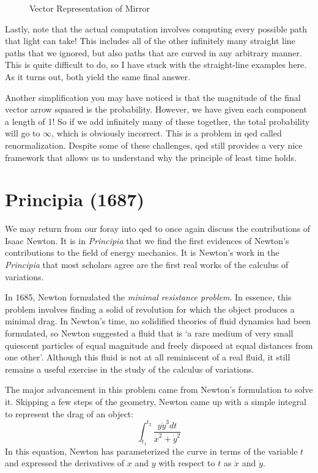 \begin{figure}
    \centering

    \caption{Vector Representation of Mirror}
    \label{fig:mirror vec 2}
\end{figure}

Lastly, note that the actual computation involves computing every possible path that light can take! This includes all of the other infinitely many straight line paths that we ignored, but also paths that are curved in any arbitrary manner. This is quite difficult to do, so I have stuck with the straight-line examples here. As it turns out, both yield the same final answer.

Another simplification you may have noticed is that the magnitude of the final vector arrow squared is the probability. However, we have given each component a length of 1! So if we add infinitely many of these together, the total probability will go to $\infty$, which is obviously incorrect. This is a problem in \gls{qed} called renormalization. Despite some of these challenges, \gls{qed} still provides a very nice framework that allows us to understand why the principle of least time holds.

\section{Principia (1687)}
We may return from our foray into \gls{qed} to once again discuss the contributions of Isaac Newton. It is in \textit{Principia} that we find the first evidences of Newton's contributions to the field of energy mechanics. It is Newton's work in the \textit{Principia} that most scholars agree are the first real works of the calculus of variations.

In 1685, Newton formulated the \textit{minimal resistance problem}. In essence, this problem involves finding a solid of revolution for which the object produces a minimal drag. In Newton's time, no solidified theories of fluid dynamics had been formulated, so Newton suggested a fluid that is `a rare medium of very small quiescent particles of equal magnitude and freely disposed at equal distances from one other'. Although this fluid is not at all reminiscent of a real fluid, it still remains a useful exercise in the study of the calculus of variations.

The major advancement in this problem came from Newton's formulation to solve it. Skipping a few steps of the geometry, Newton came up with a simple integral to represent the drag of an object:
$$\int_{t_1}^{t_2}{\frac{y\dot{y}^3dt}{\dot{x}^2+\dot{y}^2}}$$
In this equation, Newton has parameterized the curve in terms of the variable $t$ and expressed the derivatives of $x$ and $y$ with respect to $t$ as $\dot{x}$ and $\dot{y}$.

